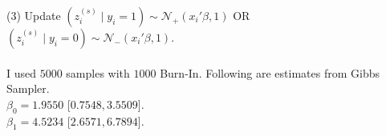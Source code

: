 \documentclass{article}
\begin{document}
(3) Update $(z_i^{(s)} \mid y_i = 1) \sim \mathcal{N}_+(x_i'\beta,1)$ OR $(z_i^{(s)} \mid y_i = 0) \sim \mathcal{N}_-(x_i'\beta,1).$\\

\\
I used $5000$ samples with $1000$ Burn-In. Following are estimates from Gibbs Sampler.\\
$\beta_0 = 1.9550$ [$0.7548,3.5509$].\\
$\beta_1 = 4.5234$ [$2.6571,6.7894$].\\

\pagebreak
{}\\

\end{document}
